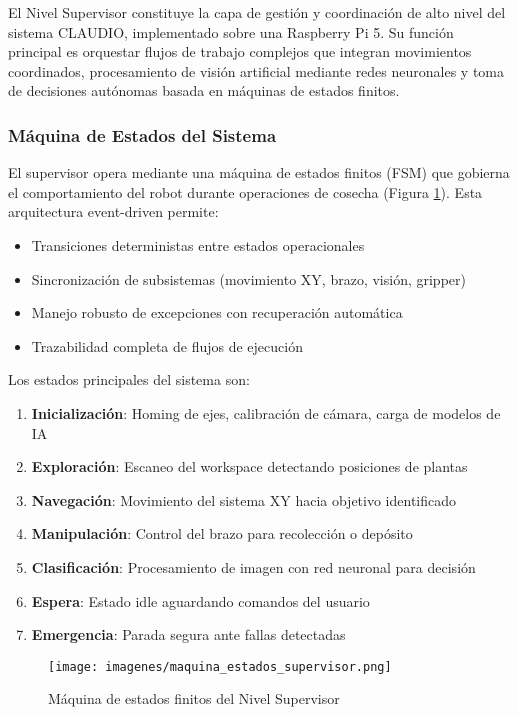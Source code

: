 El Nivel Supervisor constituye la capa de gestión y coordinación de alto nivel del sistema CLAUDIO, implementado sobre una Raspberry Pi 5. Su función principal es orquestar flujos de trabajo complejos que integran movimientos coordinados, procesamiento de visión artificial mediante redes neuronales y toma de decisiones autónomas basada en máquinas de estados finitos.

\subsubsection{Máquina de Estados del Sistema}

El supervisor opera mediante una máquina de estados finitos (FSM) que gobierna el comportamiento del robot durante operaciones de cosecha (Figura \ref{fig:maquina_estados_supervisor}). Esta arquitectura event-driven permite:

\begin{itemize}
    \item Transiciones deterministas entre estados operacionales
    \item Sincronización de subsistemas (movimiento XY, brazo, visión, gripper)
    \item Manejo robusto de excepciones con recuperación automática
    \item Trazabilidad completa de flujos de ejecución
\end{itemize}

Los estados principales del sistema son:

\begin{enumerate}
    \item \textbf{Inicialización}: Homing de ejes, calibración de cámara, carga de modelos de IA
    \item \textbf{Exploración}: Escaneo del workspace detectando posiciones de plantas
    \item \textbf{Navegación}: Movimiento del sistema XY hacia objetivo identificado
    \item \textbf{Manipulación}: Control del brazo para recolección o depósito
    \item \textbf{Clasificación}: Procesamiento de imagen con red neuronal para decisión
    \item \textbf{Espera}: Estado idle aguardando comandos del usuario
    \item \textbf{Emergencia}: Parada segura ante fallas detectadas
\end{enumerate}

\begin{figure}[H]
    \centering
    \texttt{[image: imagenes/maquina\_estados\_supervisor.png]}
    \caption{Máquina de estados finitos del Nivel Supervisor}
    \label{fig:maquina_estados_supervisor}
\end{figure}

